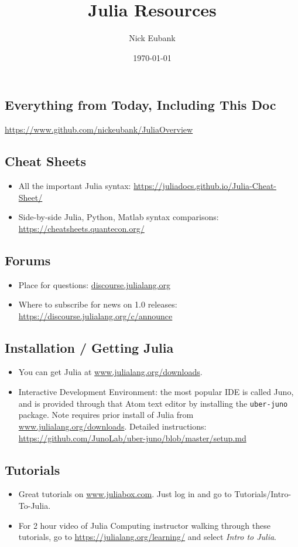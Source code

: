 \documentclass[12pt]{article}
\title{Julia Resources}
\author{Nick Eubank}
\date{\today}
\begin{document}
\maketitle

\subsection*{Everything from Today, Including This Doc}
\url{https://www.github.com/nickeubank/JuliaOverview}


\subsection*{Cheat Sheets}
\begin{itemize}
    \item All the important Julia syntax: \url{https://juliadocs.github.io/Julia-Cheat-Sheet/}
    \item Side-by-side Julia, Python, Matlab syntax comparisons: \url{https://cheatsheets.quantecon.org/}
\end{itemize}

\subsection*{Forums}
\begin{itemize}
    \item Place for questions: \url{discourse.julialang.org}
    \item Where to subscribe for news on 1.0 releases: \url{https://discourse.julialang.org/c/announce}
\end{itemize}


\subsection*{Installation / Getting Julia}
\begin{itemize}
    \item You can get Julia at \url{www.julialang.org/downloads}.
    \item Interactive Development Environment: the most popular IDE is called Juno, and is provided through that Atom text editor by installing the \texttt{uber-juno} package. Note requires prior install of Julia from \url{www.julialang.org/downloads}. Detailed instructions: \url{https://github.com/JunoLab/uber-juno/blob/master/setup.md}
\end{itemize}

\subsection*{Tutorials}
\begin{itemize}
    \item Great tutorials on \url{www.juliabox.com}. Just log in and go to Tutorials/Intro-To-Julia.
    \item For 2 hour video of Julia Computing instructor walking through these tutorials, go to \url{https://julialang.org/learning/} and select \emph{Intro to Julia}.
\end{itemize}
\end{document}
